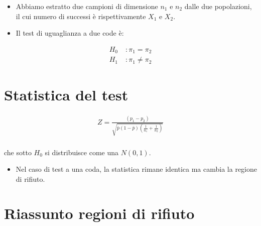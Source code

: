 \documentclass[
]{article}
\providecommand{\tightlist}{%
  \setlength{\itemsep}{0pt}\setlength{\parskip}{0pt}}
\begin{document}
\begin{itemize}
\tightlist
\item
  Abbiamo estratto due campioni di dimensione \(n_1\) e \(n_2\) dalle
  due popolazioni, il cui numero di successi è rispettivamente \(X_1\) e
  \(X_2\).
\end{itemize}

\bigskip

\begin{itemize}
\tightlist
\item
  Il test di uguaglianza a due code è:
\end{itemize}

\begin{align*}
H_0 \; & : \pi_1 = \pi_2 \\
H_1 \; & : \pi_1 \neq \pi_2
\end{align*}

\hypertarget{statistica-del-test}{%
\section{Statistica del test}\label{statistica-del-test}}

\begin{align*}
Z 
= \frac{(p_1 - p_2)}{\sqrt{\bar{p}(1-\bar{p}) \left( \frac{1}{n_1} + \frac{1}{n_2} \right)}} \\
\end{align*}

che sotto \(H_0\) si distribuisce come una \(N(0,1)\).

\bigskip

\begin{itemize}
\tightlist
\item
  Nel caso di test a una coda, la statistica rimane identica ma cambia
  la regione di rifiuto.
\end{itemize}

\hypertarget{riassunto-regioni-di-rifiuto}{%
\section{Riassunto regioni di
rifiuto}\label{riassunto-regioni-di-rifiuto}}
\end{document}

